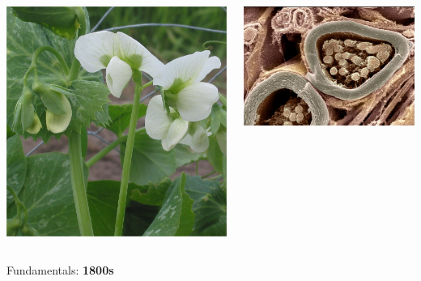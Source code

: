 {\begin{frame}
    \begin{columns}
        \begin{column}{0.43\textwidth}
            \includegraphics[width=\textwidth]{figures/Doperwt_rijserwt_bloemen_Pisum_sativum.jpg}
        \end{column}
        \begin{column}{0.57\textwidth}
            \includegraphics[width=\textwidth]{figures/myelin.jpg}
        \end{column}
    \end{columns}

\begin{center}
    Fundamentals: \textbf{1800s}
\end{center}

\end{frame}
}

